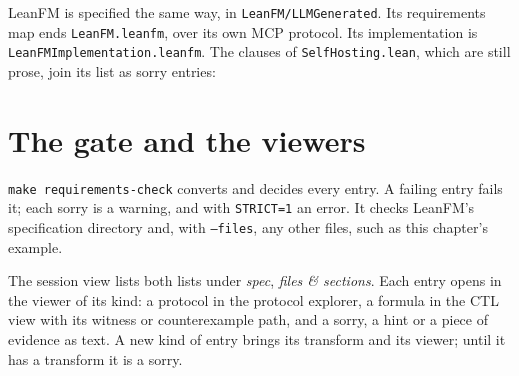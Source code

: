 {\sloppy LeanFM is specified the same way, in \texttt{LeanFM/LLMGenerated}. Its requirements
map ends \texttt{LeanFM.leanfm}, over its own MCP protocol. Its implementation is
\texttt{LeanFMImplementation.leanfm}. The clauses of \texttt{SelfHosting.lean}, which are
still prose, join its list as sorry entries:\par}


\section{The gate and the viewers}

\texttt{make requirements-check} converts and decides every entry. A failing entry fails
it; each sorry is a warning, and with \texttt{STRICT=1} an error. It checks LeanFM's
specification directory and, with \texttt{--files}, any other files, such as this
chapter's example.

The session view lists both lists under \emph{spec}, \emph{files \& sections}. Each entry
opens in the viewer of its kind: a protocol in the protocol explorer, a formula in the CTL
view with its witness or counterexample path, and a sorry, a hint or a piece of evidence as
text. A new kind of entry brings its transform and its viewer; until it has a transform it
is a sorry.
